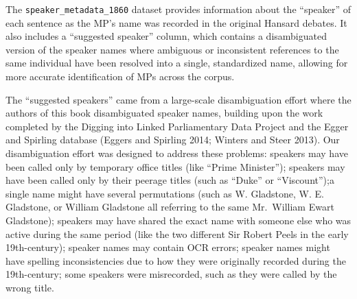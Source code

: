 \documentclass[
]{article}
\begin{document}
\begin{table}
\centering
\caption{\label{tab:unnamed-chunk-7}Speaker-level metadata for sample sentences from the 1860 Hansard corpus, including the recorded speaker name, the algorithmically suggested speaker match, and indicators for name ambiguity, fuzzy matching, and ignored cases.}
\centering
{}
\end{table}

The \texttt{speaker\_metadata\_1860} dataset provides information about
the ``speaker'' of each sentence as the MP's name was recorded in the
original Hansard debates. It also includes a ``suggested speaker''
column, which contains a disambiguated version of the speaker names
where ambiguous or inconsistent references to the same individual have
been resolved into a single, standardized name, allowing for more
accurate identification of MPs across the corpus.

The ``suggested speakers'' came from a large-scale disambiguation effort
where the authors of this book disambiguated speaker names, building
upon the work completed by the Digging into Linked Parliamentary Data
Project and the Egger and Spirling database (Eggers and Spirling 2014;
Winters and Steer 2013). Our disambiguation effort was designed to
address these problems: speakers may have been called only by temporary
office titles (like ``Prime Minister''); speakers may have been called
only by their peerage titles (such as ``Duke'' or ``Viscount'');a single
name might have several permutations (such as W. Gladstone, W. E.
Gladstone, or William Gladstone all referring to the same Mr.~William
Ewart Gladstone); speakers may have shared the exact name with someone
else who was active during the same period (like the two different Sir
Robert Peels in the early 19th-century); speaker names may contain OCR
errors; speaker names might have spelling inconsistencies due to how
they were originally recorded during the 19th-century; some speakers
were misrecorded, such as they were called by the wrong title.
\end{document}
